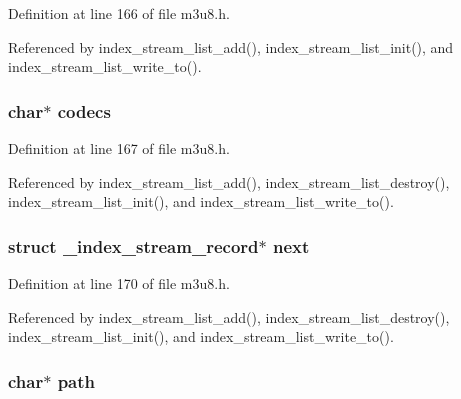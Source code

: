 \-Definition at line 166 of file m3u8.\-h.



\-Referenced by index\-\_\-stream\-\_\-list\-\_\-add(), index\-\_\-stream\-\_\-list\-\_\-init(), and index\-\_\-stream\-\_\-list\-\_\-write\-\_\-to().

\hypertarget{struct_index_stream_record_a059ea02ff9dcb573204e15648bf712bd}{
\subsubsection[{codecs}]{\setlength{\rightskip}{0pt plus 5cm}char$\ast$ {\bf codecs}}}\label{struct_index_stream_record_a059ea02ff9dcb573204e15648bf712bd}


\-Definition at line 167 of file m3u8.\-h.



\-Referenced by index\-\_\-stream\-\_\-list\-\_\-add(), index\-\_\-stream\-\_\-list\-\_\-destroy(), index\-\_\-stream\-\_\-list\-\_\-init(), and index\-\_\-stream\-\_\-list\-\_\-write\-\_\-to().

\hypertarget{struct_index_stream_record_aad0507926208e410a30e1bf90569e601}{
\subsubsection[{next}]{\setlength{\rightskip}{0pt plus 5cm}struct \-\_\-index\-\_\-stream\-\_\-record$\ast$ {\bf next}}}\label{struct_index_stream_record_aad0507926208e410a30e1bf90569e601}


\-Definition at line 170 of file m3u8.\-h.



\-Referenced by index\-\_\-stream\-\_\-list\-\_\-add(), index\-\_\-stream\-\_\-list\-\_\-destroy(), index\-\_\-stream\-\_\-list\-\_\-init(), and index\-\_\-stream\-\_\-list\-\_\-write\-\_\-to().

\hypertarget{struct_index_stream_record_a44196e6a5696d10442c29e639437196e}{
\subsubsection[{path}]{\setlength{\rightskip}{0pt plus 5cm}char$\ast$ {\bf path}}}\label{struct_index_stream_record_a44196e6a5696d10442c29e639437196e}


